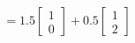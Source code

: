 \documentclass[preview]{standalone}
\begin{document}
\begin{align*}
= 1.5 \begin{bmatrix} 1 \\ 0 \end{bmatrix} + 0.5 \begin{bmatrix} 1 \\ 2 \end{bmatrix}
\end{align*}
\end{document}
